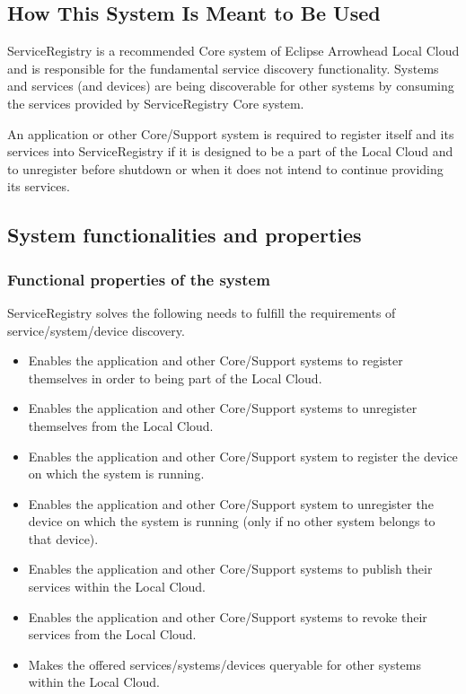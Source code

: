 \documentclass[a4paper]{arrowhead}
\begin{document}
\subsection{How This System Is Meant to Be Used}
\label{sec:use}

ServiceRegistry is a recommended Core system of Eclipse Arrowhead Local Cloud and is responsible for the fundamental service discovery functionality. Systems and services (and devices) are being discoverable for other systems by consuming the services provided by ServiceRegistry Core system.

An application or other Core/Support system is required to register itself and its services into ServiceRegistry if it is designed to be a part of the Local Cloud and to unregister before shutdown or when it does not intend to continue providing its services.

\subsection{System functionalities and properties}
\label{sec:properties}

\subsubsection {Functional properties of the system}
ServiceRegistry solves the following needs to fulfill the requirements of service/system/device discovery.

\begin{itemize}
    \item Enables the application and other Core/Support systems to register themselves in order to being part of the Local Cloud.
    \item Enables the application and other Core/Support systems to unregister themselves from the Local Cloud.
    \item Enables the application and other Core/Support system to register the device on which the system is running.
    \item Enables the application and other Core/Support system to unregister the device on which the system is running (only if no other system belongs to that device).
    \item Enables the application and other Core/Support systems to publish their services within the Local Cloud.
    \item Enables the application and other Core/Support systems to revoke their services from the Local Cloud.
    \item Makes the offered services/systems/devices queryable for other systems within the Local Cloud.
\end{itemize}
\end{document}
